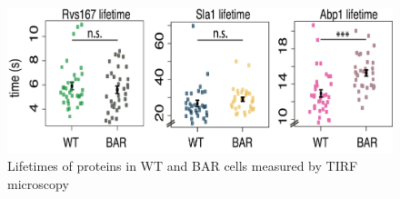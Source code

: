 \begin{figure}[H]
	\vspace{4cm}
	\includegraphics[scale=0.6]{figures/appendix/delsh3_5}
	\caption[Lifetimes of proteins in WT and BAR cells]
{ Lifetimes of proteins in WT and BAR cells measured by TIRF microscopy}
\end{figure}